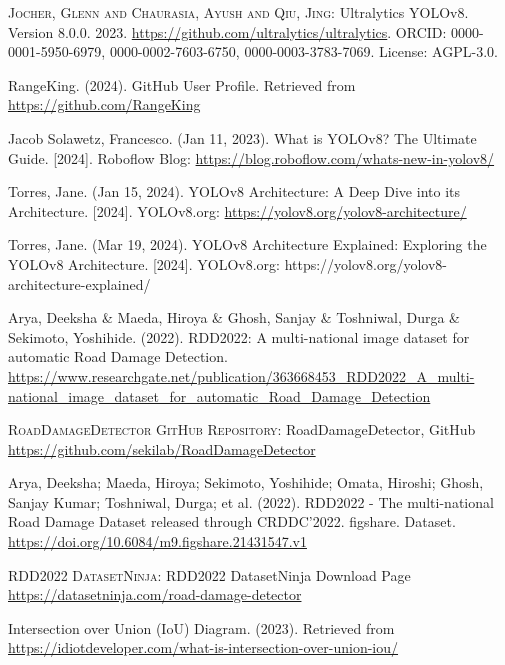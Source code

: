 \begin{thebibliography}{10}
        \textsc{Jocher, Glenn and Chaurasia, Ayush and Qiu, Jing}:
        Ultralytics YOLOv8.
        Version 8.0.0.
        2023.
        \url{https://github.com/ultralytics/ultralytics}.
        \textsc{ORCID}: 0000-0001-5950-6979, 0000-0002-7603-6750, 0000-0003-3783-7069.
        License: AGPL-3.0.

        RangeKing. (2024). GitHub User Profile.
        Retrieved from \url{https://github.com/RangeKing}

        Jacob Solawetz, Francesco. (Jan 11, 2023). What is YOLOv8? The Ultimate Guide. [2024]. Roboflow Blog: \url{https://blog.roboflow.com/whats-new-in-yolov8/}

        Torres, Jane. (Jan 15, 2024). YOLOv8 Architecture: A Deep Dive into its Architecture. [2024]. YOLOv8.org: \url{https://yolov8.org/yolov8-architecture/}

        Torres, Jane. (Mar 19, 2024). YOLOv8 Architecture Explained: Exploring the YOLOv8 Architecture. [2024]. YOLOv8.org: https://yolov8.org/yolov8-architecture-explained/

        Arya, Deeksha \& Maeda, Hiroya \& Ghosh, Sanjay \& Toshniwal, Durga \& Sekimoto, Yoshihide. (2022). RDD2022: A multi-national image dataset for automatic Road Damage Detection. 
        \url{https://www.researchgate.net/publication/363668453_RDD2022_A_multi-national_image_dataset_for_automatic_Road_Damage_Detection}

        \textsc{RoadDamageDetector GitHub Repository}:
        RoadDamageDetector, GitHub
        \url{https://github.com/sekilab/RoadDamageDetector}

        Arya, Deeksha; Maeda, Hiroya; Sekimoto, Yoshihide; Omata, Hiroshi; Ghosh, Sanjay Kumar; Toshniwal, Durga; et al. (2022). RDD2022 - The multi-national Road Damage Dataset released through CRDDC'2022. figshare. Dataset. \url{https://doi.org/10.6084/m9.figshare.21431547.v1}

        \textsc{RDD2022 DatasetNinja}:
        RDD2022 DatasetNinja Download Page
        \url{https://datasetninja.com/road-damage-detector}

        Intersection over Union (IoU) Diagram. (2023). Retrieved from \url{https://idiotdeveloper.com/what-is-intersection-over-union-iou/}


\end{thebibliography}
